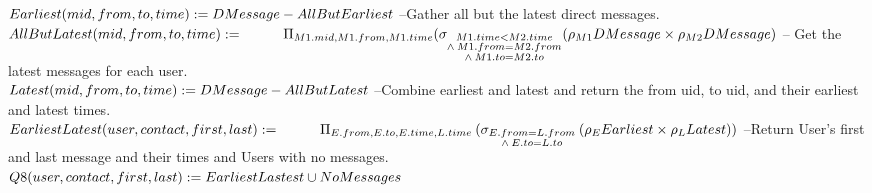 \documentclass{article}
\begin{document}
\begin{enumerate}
{$
Earliest(mid, from, to, time) := DMessage - AllButEarliest \\\\[5pt]
$
\hspace*{1cm} --Gather all but the latest direct messages.  \\[5pt]
$
AllButLatest(mid, from, to, time) := \\ 
\hspace*{1cm} \Pi_{M1.mid, M1.from, M1.time} (\sigma_{\substack{M1.time < M2.time \\
					\wedge \: M1.from = M2.from \\
					\wedge \: M1.to = M2.to}}
					(\rho_{M1} DMessage \times \rho_{M2} DMessage) \\\\\\
$
\hspace*{1cm} -- Get the latest messages for each user.  \\[5pt]
$
Latest(mid, from, to, time) := DMessage - AllButLatest \\\\ [5pt]
$
\hspace*{1cm} --Combine earliest and latest and return the from uid, to uid, and their earliest \hspace*{1cm} and latest times.  \\[5pt]
$
EarliestLatest(user, contact, first, last) := \\
\hspace*{1cm} \Pi_{E.from, E.to, E.time, L.time} \:
					 (\sigma_{\substack{E.from = L.from \\
					 \wedge \: E.to = L.to}} \: (\rho_{E}Earliest \times \rho_{L}Latest)) \\\\ [5pt]
$
\hspace*{1cm} --Return User's first and last message and their times and Users with no messages. \\ [5pt]
$
Q8(user, contact, first, last) := EarliestLastest \cup NoMessages  \\ 
$
}


\end{enumerate}
\end{document}
